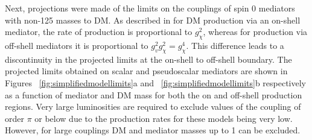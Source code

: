 Next, projections were made of the limits on the couplings of spin 0 mediators with non-125 \GeV masses to \ac{DM}. As described in  for \ac{DM} production via an on-shell mediator, the rate of production is proportional to $g_{\chi}^{2}$, whereas for production via off-shell mediators it is proportional to $g_{v}^{2}g_{\chi}^{2}=g_{\chi}^{4}$. This difference leads to a discontinuity in the projected limits at the on-shell to off-shell boundary. The projected limits obtained on scalar and pseudoscalar mediators are shown in Figures ~\ref{fig:simplifiedmodellimits}a and ~\ref{fig:simplifiedmodellimits}b respectively as a function of mediator and \ac{DM} mass for both the on and off-shell production regions. Very large luminosities are required to exclude values of the coupling of order $\pi$ or below due to the production rates for these models being very low. However, for large couplings \ac{DM} and mediator masses up to 1 \TeV can be excluded.

